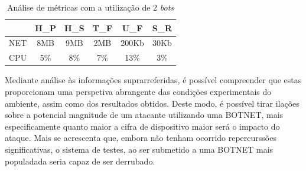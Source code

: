 \begin{table}[!h]
    \renewcommand{\arraystretch}{1.3}
    \caption{Análise de métricas com a utilização de 2 \textit{bots}}
    \label{tab:table-2-bots}
    \centering
    \begin{tabular}{|c|c|c|c|c|c|}
        \hline
            & H\_P & H\_S & T\_F & U\_F  & S\_R \\
        \hline
        NET & 8MB  & 9MB  & 2MB  & 200Kb & 30Kb \\
        \hline
        CPU & 5\%  & 8\%  & 7\%  & 13\%  & 3\%  \\
        \hline
    \end{tabular}
\end{table}

Mediante análise às informações suprarreferidas, é possível compreender que estas proporcionam uma perspetiva abrangente das condições experimentais do ambiente, assim como dos resultados obtidos. Deste modo, é possível tirar ilações sobre a potencial magnitude de um atacante utilizando uma BOTNET, mais especificamente quanto maior a cifra de dispositivo maior será o impacto do ataque. Mais se acrescenta que, embora não tenham ocorrido repercurssões significativas, o sistema de testes, ao ser submetido a uma BOTNET mais populadada seria capaz de ser derrubado.
